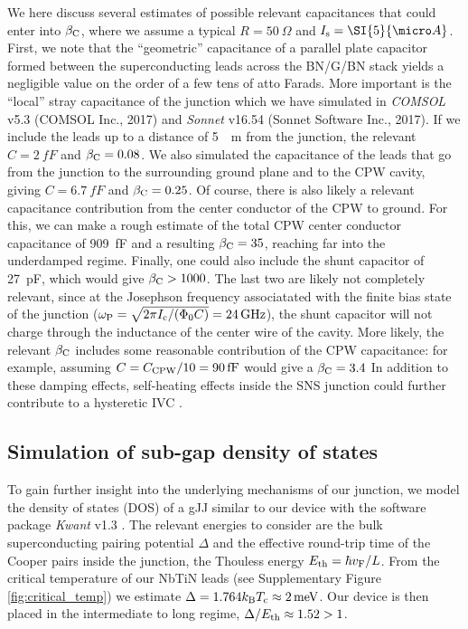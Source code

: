 We here discuss several estimates of possible relevant capacitances that could enter into $\beta_{\rm C}$, where we assume a typical $R=\SI{50}{\Omega}$ and $I_{\rm s}=\SI{5}{\micro A}$.
First, we note that the ``geometric'' capacitance of a parallel plate capacitor formed between the superconducting leads across the BN/G/BN stack yields a negligible value on the order of a few tens of atto Farads.
More important is the ``local'' stray capacitance of the junction which we have simulated in \textit{COMSOL} v5.3 (COMSOL Inc., 2017) and \textit{Sonnet} v16.54 (Sonnet Software Inc., 2017).
If we include the leads up to a distance of \SI{5}{\mu m} from the junction, the relevant $C=\SI{2}{fF}$ and $\beta_{\rm C}=0.08$.
We also simulated the capacitance of the leads that go from the junction to the surrounding ground plane and to the CPW cavity, giving $C=\SI{6.7}{fF}$ and $\beta_{\rm C}=0.25$.
Of course, there is also likely a relevant capacitance contribution from the center conductor of the CPW to ground.
For this, we can make a rough estimate of the total CPW center conductor capacitance of \SI{909}{fF} and a resulting $\beta_{\rm C}=35$, reaching far into the underdamped regime.
Finally, one could also include the shunt capacitor of \SI{27}{pF}, which would give $\beta_{\rm C}>1000$. 
The last two are likely not completely relevant, since at the Josephson frequency associatated with the finite bias state of the junction ($\omega_{\rm P}=\sqrt{2\pi I_{\rm c}/(\Phi_0 C)}=\SI{24}{GHz}$), the shunt capacitor will not charge through the inductance of the center wire of the cavity. 
More likely, the relevant $\beta_{\rm C}$ includes some reasonable contribution of the CPW capacitance: for example, assuming $C = C_{\rm CPW} / 10 = \SI{90}{fF}$ would give a $\beta_{\rm C} = 3.4$
In addition to these damping effects, self-heating effects inside the SNS junction could further contribute to a hysteretic IVC \cite{courtois_origin_2008,borzenets_phonon_2013}.




\subsection{Simulation of sub-gap density of states}\label{sec:subgap}
\noindent To gain further insight into the underlying mechanisms of our junction, we model the density of states (DOS) of a gJJ similar to our device with the software package \textit{Kwant} v1.3 \cite{groth_kwant_2014}.
The relevant energies to consider are the bulk superconducting pairing potential $\Delta$ and the effective round-trip time of the Cooper pairs inside the junction, the Thouless energy $E_{\rm th}=\hbar v_{\rm F}/L$.
From the critical temperature of our NbTiN leads (see Supplementary Figure \ref{fig:critical_temp}) we estimate\cite{tinkham_introduction_1996} $\Delta=1.764k_{\rm B} T_{\rm c}\approx\SI{2}{meV}$.
Our device is then placed in the intermediate to long regime, $\Delta/E_{\rm th}\approx1.52>1$.


